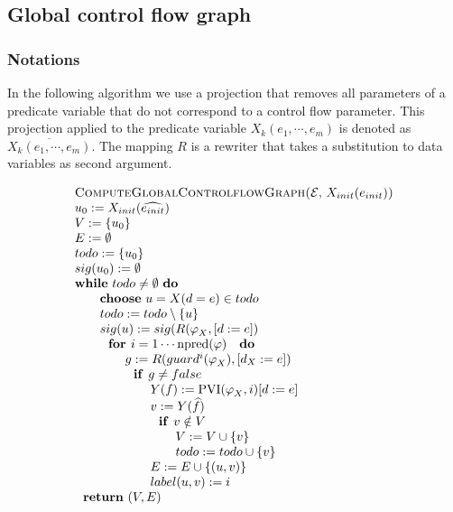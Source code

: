 \documentclass{article}
\begin{document}
\subsection{Global control flow graph}

\subsubsection{Notations}

In the following algorithm we use a projection that removes all parameters
of a predicate variable that do not correspond to a control flow parameter.
This projection applied to the predicate variable $X_{k}(e_{1},\cdots
,e_{m}) $ is denoted as $\overline{X_{k}(e_{1},\cdots ,e_{m})}$. The mapping 
$R$ is a rewriter that takes a substitution to data variables as second
argument.

\begin{equation*}
\begin{tabular}{l}
\textsc{ComputeGlobalControlflowGraph(}$\mathcal{E}$, $X_{init}(e_{init})$%
\textsc{)} \\ 
$u_{0}:=X_{init}(\widehat{e_{init}})$ \\ 
$V:=\{u_{0}\}$ \\ 
$E:=\emptyset $ \\ 
$todo:=\{u_{0}\}$ \\ 
$sig(u_{0}):=\emptyset $ \\ 
\textbf{while} $todo\neq \emptyset $ \textbf{do} \\ 
$\qquad $\textbf{choose} $u=X(d=e)\in todo$ \\ 
$\qquad todo:=todo\setminus \{u\}$ \\ 
$\qquad sig(u):=sig(R(\varphi _{X},[d:=e])$ \\ 
$\qquad \text{\textbf{for }}i=1\cdots \mathrm{npred}(\varphi )\text{ \textbf{%
do}}$ \\ 
$\qquad \qquad g:=R(guard^{i}(\varphi _{X}),[d_{X}:=e])$ \\ 
$\qquad \qquad \text{\textbf{if }}g\neq false$ \\ 
$\qquad \qquad \qquad Y(f):=\mathrm{PVI}(\varphi _{X},i)[d:=e]$ \\ 
$\qquad \qquad \qquad v:=Y(\widehat{f})$ \\ 
$\qquad \qquad \qquad \text{\textbf{if }}v\notin V$ \\ 
$\qquad \qquad \qquad \qquad V:=V\cup \{v\}$ \\ 
$\qquad \qquad \qquad \qquad todo:=todo\cup \{v\}$ \\ 
$\qquad \qquad \qquad E:=E\cup \{(u,v)\}$ \\ 
$\qquad \qquad \qquad label(u,v):=i$ \\ 
$\text{\textbf{return} }(V,E)$%
\end{tabular}%
\end{equation*}
\end{document}

